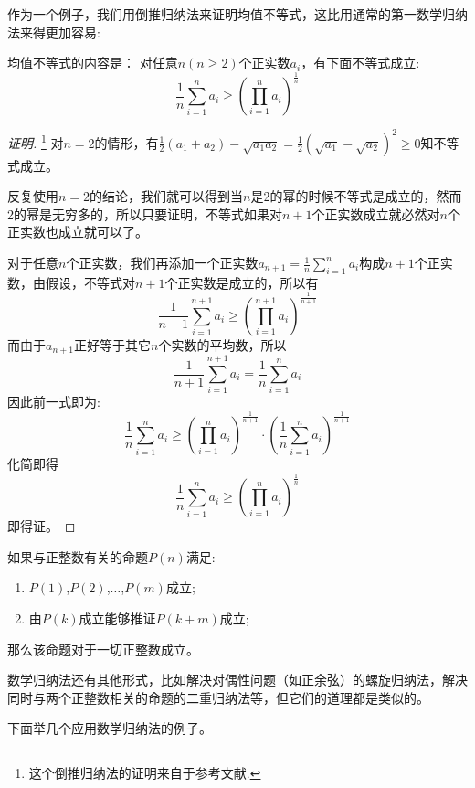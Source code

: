 \begin{example}[均值不等式]
作为一个例子，我们用倒推归纳法来证明均值不等式，这比用通常的第一数学归纳法来得更加容易:

  均值不等式的内容是： 对任意$n(n\geqslant2)$个正实数$a_i$，有下面不等式成立:
\[ \frac{1}{n}\sum_{i=1}^na_i \geqslant \left( \prod_{i=1}^na_i \right)^{\frac{1}{n}} \]

\begin{proof}[证明]\footnote{这个倒推归纳法的证明来自于参考文献\cite{the-secret-of-inequality}.}
  对$n=2$的情形，有$\frac{1}{2}(a_1+a_2)-\sqrt{a_1a_2}=\frac{1}{2}(\sqrt{a_1}-\sqrt{a_2})^2\geqslant 0$知不等式成立。

 反复使用$n=2$的结论，我们就可以得到当$n$是2的幂的时候不等式是成立的，然而2的幂是无穷多的，所以只要证明，不等式如果对$n+1$个正实数成立就必然对$n$个正实数也成立就可以了。

对于任意$n$个正实数，我们再添加一个正实数$a_{n+1}=\frac{1}{n}\sum_{i=1}^na_i$构成$n+1$个正实数，由假设，不等式对$n+1$个正实数是成立的，所以有
\[
\frac{1}{n+1}\sum_{i=1}^{n+1}a_i \geqslant \left( \prod_{i=1}^{n+1}a_i \right)^{\frac{1}{n+1}}
\]
而由于$a_{n+1}$正好等于其它$n$个实数的平均数，所以
\[ \frac{1}{n+1}\sum_{i=1}^{n+1}a_i = \frac{1}{n}\sum_{i=1}^{n}a_i \]
因此前一式即为:
\[
\frac{1}{n}\sum_{i=1}^{n}a_i \geqslant \left( \prod_{i=1}^{n}a_i \right)^{\frac{1}{n+1}} \cdot \left( \frac{1}{n}\sum_{i=1}^na_i \right)^{\frac{1}{n+1}}
\]
化简即得
\[
\frac{1}{n}\sum_{i=1}^na_i \geqslant \left( \prod_{i=1}^na_i \right)^{\frac{1}{n}} 
\]
即得证。
\end{proof}
\end{example}

\begin{principle}[跳跃数学归纳法]
  如果与正整数有关的命题$P(n)$满足:
  \begin{enumerate}
  \item $P(1)$,$P(2)$,$\ldots$,$P(m)$成立;
  \item 由$P(k)$成立能够推证$P(k+m)$成立;
  \end{enumerate}
那么该命题对于一切正整数成立。
\end{principle}

数学归纳法还有其他形式，比如解决对偶性问题（如正余弦）的螺旋归纳法，解决同时与两个正整数相关的命题的二重归纳法等，但它们的道理都是类似的。

下面举几个应用数学归纳法的例子。

